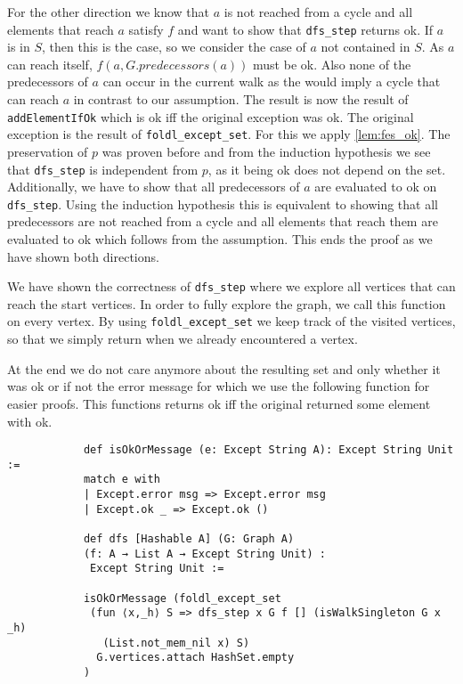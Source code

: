 \documentclass{article}
\begin{document}
        For the other direction we know that $a$ is not reached from a cycle and all elements that reach $a$ satisfy $f$ and want to show that \texttt{dfs\_step} returns ok. If $a$ is in $S$, then this is the case, so we consider the case of $a$ not contained in $S$. As $a$ can reach itself, $f(a, G.predecessors(a))$ must be ok. Also none of the predecessors of $a$ can occur in the current walk as the would imply a cycle that can reach $a$ in contrast to our assumption. The result is now the result of \texttt{addElementIfOk} which is ok iff the original exception was ok. The original exception is the result of \texttt{foldl\_except\_set}. For this we apply \ref{lem:fes_ok}. The preservation of $p$ was proven before and from the induction hypothesis we see that \texttt{dfs\_step} is independent from $p$, as it being ok does not depend on the set. Additionally, we have to show that all predecessors of $a$ are evaluated to ok on \texttt{dfs\_step}. Using the induction hypothesis this is equivalent to showing that all predecessors are not reached from a cycle and all elements that reach them are evaluated to ok which follows from the assumption. This ends the proof as we have shown both directions.

        We have shown the correctness of \texttt{dfs\_step} where we explore all vertices that can reach the start vertices. In order to fully explore the graph, we call this function on every vertex. By using \texttt{foldl\_except\_set} we keep track of the visited vertices, so that we simply return when we already encountered a vertex. 

        At the end we do not care anymore about the resulting set and only whether it was ok or if not the error message for which we use the following function for easier proofs. This functions returns ok iff the original returned some element with ok.

        \begin{lstlisting}
            def isOkOrMessage (e: Except String A): Except String Unit :=
            match e with
            | Except.error msg => Except.error msg
            | Except.ok _ => Except.ok ()

            def dfs [Hashable A] (G: Graph A) 
            (f: A → List A → Except String Unit) :
             Except String Unit :=
  
            isOkOrMessage (foldl_except_set 
             (fun ⟨x,_h⟩ S => dfs_step x G f [] (isWalkSingleton G x _h) 
               (List.not_mem_nil x) S)
              G.vertices.attach HashSet.empty 
            )
        \end{lstlisting}
\end{document}
